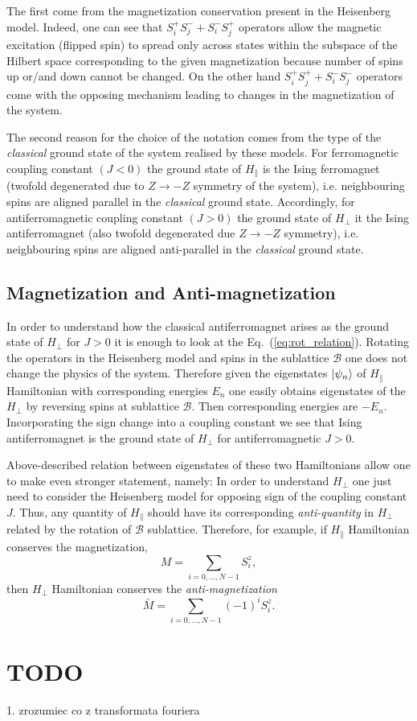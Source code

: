 \documentclass[12pt, a4paper]{article}
\begin{document}
The first come from the magnetization conservation present in the Heisenberg model. Indeed, one can see that $S_i^+ S_j^- + S_i^- S_j^+$ operators allow the magnetic excitation (flipped spin) to spread only across states within the subspace of the Hilbert space corresponding to the given magnetization because number of spins up or/and down cannot be changed. On the other hand $S_i^+ S_j^+ + S_i^- S_j^-$ operators come with the opposing mechanism leading to changes in the magnetization of the system. 

The second reason for the choice of the notation comes from the type of the \textit{classical} ground state of the system realised by these models. For ferromagnetic coupling constant $(J < 0)$ the ground state of $H_{\parallel}$ is the Ising ferromagnet (twofold degenerated due to $Z \to -Z$ symmetry of the system), i.e. neighbouring spins are aligned parallel in the \textit{classical} ground state. Accordingly, for antiferromagnetic coupling constant $(J > 0)$ the ground state of $H_{\perp}$ it the Ising antiferromagnet (also twofold degenerated due $Z \to -Z$ symmetry), i.e. neighbouring spins are aligned anti-parallel in the \textit{classical} ground state.

\subsection{Magnetization and Anti-magnetization}
In order to understand how the classical antiferromagnet arises as the ground state of $H_{\perp}$ for $J > 0$ it is enough to look at the Eq.~(\ref{eq:rot_relation}). Rotating the operators in the Heisenberg model and spins in the sublattice $\mathcal{B}$ one does not change the physics of the system. Therefore given the eigenstates $\ket{\psi_n}$ of $H_{\parallel}$ Hamiltonian with corresponding energies $E_n$ one easily obtains eigenstates of the $H_{\perp}$ by reversing spins at sublattice $\mathcal{B}$. Then corresponding energies are $-E_n$. Incorporating the sign change into a coupling constant we see that Ising antiferromagnet is the ground state of $H_{\perp}$ for antiferromagnetic $J > 0$. 

Above-described relation between eigenstates of these two Hamiltonians allow one to make even stronger statement, namely: In order to understand $H_{\perp}$ one just need to consider the Heisenberg model for opposing sign of the coupling constant $J$. Thus, any quantity of $H_{\parallel}$ should have its corresponding \textit{anti-quantity} in $H_{\perp}$ related by the rotation of $\mathcal{B}$ sublattice. Therefore, for example, if $H_{\parallel}$ Hamiltonian conserves the magnetization,
\begin{equation}
M = \sum_{i = 0,\hdots,N-1} S_i^z,
\end{equation}
then $H_{\perp}$ Hamiltonian conserves the \textit{anti-magnetization}
\begin{equation}
\bar{M} = \sum_{i = 0,\hdots,N-1} (-1)^i S_i^z.
\end{equation}

\section{TODO}
1. zrozumiec co z transformata fouriera
\end{document}
